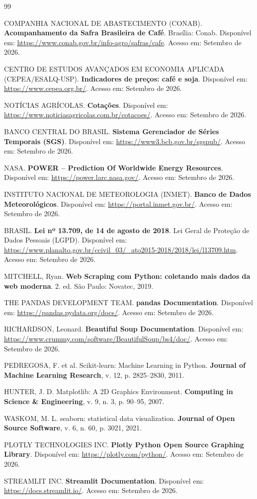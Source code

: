 \documentclass{article}
\begin{document}
\begin{thebibliography}{99}

COMPANHIA NACIONAL DE ABASTECIMENTO (CONAB). \textbf{Acompanhamento da Safra Brasileira de Café}.
Brasília: Conab. Disponível em: \url{https://www.conab.gov.br/info-agro/safras/cafe}. Acesso em: Setembro
de 2026.

CENTRO DE ESTUDOS AVANÇADOS EM ECONOMIA APLICADA (CEPEA/ESALQ-USP). \textbf{Indicadores de preços:
café e soja}. Disponível em: \url{https://www.cepea.org.br/}. Acesso em: Setembro de 2026.

NOTÍCIAS AGRÍCOLAS. \textbf{Cotações}. Disponível em:
\url{https://www.noticiasagricolas.com.br/cotacoes/}. Acesso em: Setembro de 2026.

BANCO CENTRAL DO BRASIL. \textbf{Sistema Gerenciador de Séries Temporais (SGS)}. Disponível em:
\url{https://www3.bcb.gov.br/sgspub/}. Acesso em: Setembro de 2026.

NASA. \textbf{POWER -- Prediction Of Worldwide Energy Resources}. Disponível em:
\url{https://power.larc.nasa.gov/}. Acesso em: Setembro de 2026.

INSTITUTO NACIONAL DE METEOROLOGIA (INMET). \textbf{Banco de Dados Meteorológicos}. Disponível em:
\url{https://portal.inmet.gov.br/}. Acesso em: Setembro de 2026.

BRASIL. \textbf{Lei nº 13.709, de 14 de agosto de 2018}. Lei Geral de Proteção de Dados Pessoais (LGPD).
Disponível em: \url{https://www.planalto.gov.br/ccivil_03/_ato2015-2018/2018/lei/l13709.htm}. Acesso em:
Setembro de 2026.

MITCHELL, Ryan. \textbf{Web Scraping com Python: coletando mais dados da web moderna}. 2. ed. São Paulo:
Novatec, 2019.

THE PANDAS DEVELOPMENT TEAM. \textbf{pandas Documentation}. Disponível em:
\url{https://pandas.pydata.org/docs/}. Acesso em: Setembro de 2026.

RICHARDSON, Leonard. \textbf{Beautiful Soup Documentation}. Disponível em:
\url{https://www.crummy.com/software/BeautifulSoup/bs4/doc/}. Acesso em: Setembro de 2026.

PEDREGOSA, F. et al. Scikit-learn: Machine Learning in Python. \textbf{Journal of Machine Learning
Research}, v. 12, p. 2825--2830, 2011.

HUNTER, J. D. Matplotlib: A 2D Graphics Environment. \textbf{Computing in Science \& Engineering}, v. 9,
n. 3, p. 90--95, 2007.

WASKOM, M. L. seaborn: statistical data visualization. \textbf{Journal of Open Source Software}, v. 6,
n. 60, p. 3021, 2021.

PLOTLY TECHNOLOGIES INC. \textbf{Plotly Python Open Source Graphing Library}. Disponível em:
\url{https://plotly.com/python/}. Acesso em: Setembro de 2026.

STREAMLIT INC. \textbf{Streamlit Documentation}. Disponível em: \url{https://docs.streamlit.io/}. Acesso
em: Setembro de 2026.

\end{thebibliography}
\end{document}
